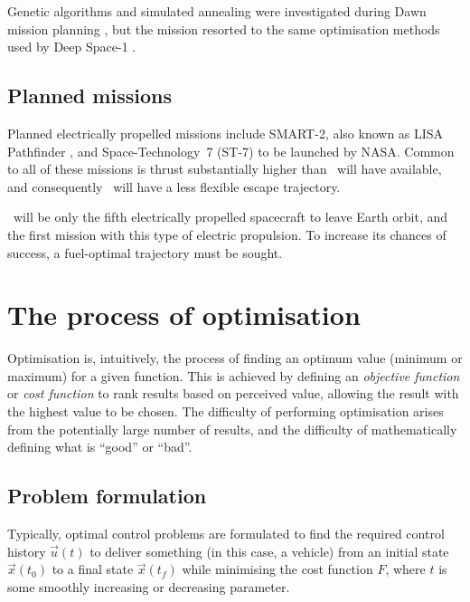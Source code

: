 Genetic algorithms and simulated annealing were investigated during Dawn mission planning \parencite{Lee2005a}, but the mission resorted to the same optimisation methods used by Deep Space-1 \parencite{Rayman2007}.

\subsection{Planned missions}
Planned electrically propelled missions include SMART-2, also known as LISA Pathfinder \parencite{web_SMART-2}, and Space-Technology~7 (ST-7) to be launched by NASA. Common to all of these missions is thrust substantially higher than \BW\ will have available, and consequently \BW\ will have a less flexible escape trajectory.

\BW\ will be only the fifth electrically propelled spacecraft to leave Earth orbit, and the first mission with this type of electric propulsion.
To increase its chances of success, a fuel-optimal trajectory must be sought.



\section{The process of optimisation} \label{sec:Optimisation-methods}

Optimisation is, intuitively, the process of finding an optimum value (minimum or maximum) for a given function. This is achieved by defining an \emph{objective function} or \emph{cost function} to rank results based on perceived value, allowing the result with the highest value to be chosen. The difficulty of performing optimisation arises from the potentially large number of results, and the difficulty of mathematically defining what is \enquote{good} or \enquote{bad}. 

\subsection{Problem formulation} \label{sub:Formulation}

Typically, optimal control problems are formulated to find the required control history $\vec{u}(t)$ to deliver something (in this case, a vehicle) from an initial state $\vec{x}(t_0)$ to a final state $\vec{x}(t_f)$ while minimising the cost function $F$, where $t$ is some smoothly increasing or decreasing parameter. 

